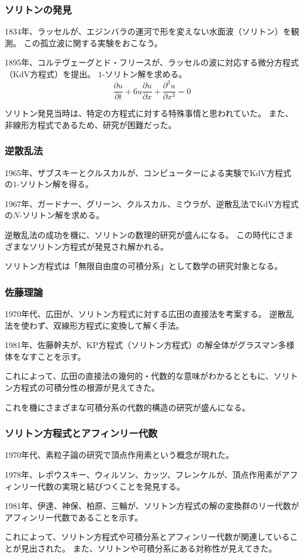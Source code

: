 \documentclass{beamer}
\begin{document}
\begin{frame}
    \frametitle{ソリトンの発見}

    1834年、ラッセルが、エジンバラの運河で形を変えない水面波（ソリトン）を観測。
    この孤立波に関する実験をおこなう。

    \bigskip
    1895年、コルテヴェーグとド・フリースが、ラッセルの波に対応する微分方程式（KdV方程式）を提出。
    $1$-ソリトン解を求める。
    \begin{equation}
        \frac{∂u}{∂t}+6u\frac{∂u}{∂x}+\frac{∂^3u}{∂x^3}=0
    \end{equation}

    \bigskip
    ソリトン発見当時は、特定の方程式に対する特殊事情と思われていた。
    また、非線形方程式であるため、研究が困難だった。
\end{frame}

\begin{frame}
    \frametitle{逆散乱法}

    1965年、ザブスキーとクルスカルが、コンピューターによる実験でKdV方程式の$1$-ソリトン解を得る。

    \bigskip
    1967年、ガードナー、グリーン、クルスカル、ミウラが、逆散乱法でKdV方程式の$N$-ソリトン解を求める。

    \bigskip
    逆散乱法の成功を機に、ソリトンの数理的研究が盛んになる。
    この時代にさまざまなソリトン方程式が発見され解かれる。

    \bigskip
    ソリトン方程式は「無限自由度の可積分系」として数学の研究対象となる。
\end{frame}

\begin{frame}
    \frametitle{佐藤理論}

    1970年代、広田が、ソリトン方程式に対する広田の直接法を考案する。
    逆散乱法を使わず、双線形方程式に変換して解く手法。

    \bigskip
    1981年、佐藤幹夫が、KP方程式（ソリトン方程式）の解全体がグラスマン多様体をなすことを示す。

    \bigskip
    これによって、広田の直接法の幾何的・代数的な意味がわかるとともに、ソリトン方程式の可積分性の根源が見えてきた。

    \bigskip
    これを機にさまざまな可積分系の代数的構造の研究が盛んになる。

\end{frame}

\begin{frame}
    \frametitle{ソリトン方程式とアフィンリー代数}

    1970年代、素粒子論の研究で頂点作用素という概念が現れた。

    \bigskip
    1978年、レポウスキー、ウィルソン、カッツ、フレンケルが、頂点作用素がアフィンリー代数の実現と結びつくことを発見する。

    \bigskip
    1981年、伊達、神保、柏原、三輪が、ソリトン方程式の解の変換群のリー代数がアフィンリー代数であることを示す。

    \bigskip
    これによって、ソリトン方程式や可積分系とアフィンリー代数が関連していることが見出された。
    また、ソリトンや可積分系にある対称性が見えてきた。
\end{frame}
\end{document}
